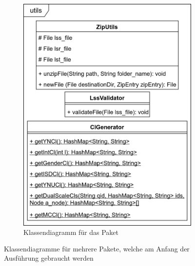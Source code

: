 \begin{figure}[h]
{\begin{subfigure}[b]{.6\textwidth}
			\includegraphics[width=.95\textwidth]{./img/cls_utils.png}
			\caption{Klassendiagramm für das Paket }
		\end{subfigure}%
		}
		\caption{Klassendiagramme für mehrere Pakete, welche am Anfang der Ausführung gebraucht werden}
\end{figure}

